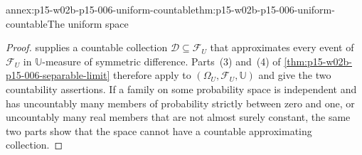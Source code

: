 \begin{annexitem}{annex:p15-w02b-p15-006-uniform-countable}{thm:p15-w02b-p15-006-uniform-countable}{The uniform space}
\begin{proof}
 supplies a countable
collection \(\mathcal D\subseteq\mathcal F_U\) that approximates every
event of \(\mathcal F_U\) in \(\mathbb U\)-measure of symmetric
difference. Parts~(3) and~(4) of
\cref{thm:p15-w02b-p15-006-separable-limit} therefore apply to
\((\Omega_U,\mathcal F_U,\mathbb U)\) and give the two countability
assertions. If a family on some probability space is independent and
has uncountably many members of probability strictly between zero and
one, or uncountably many real members that are not almost surely
constant, the same two parts show that the space cannot have a
countable approximating collection.
\end{proof}
\end{annexitem}

